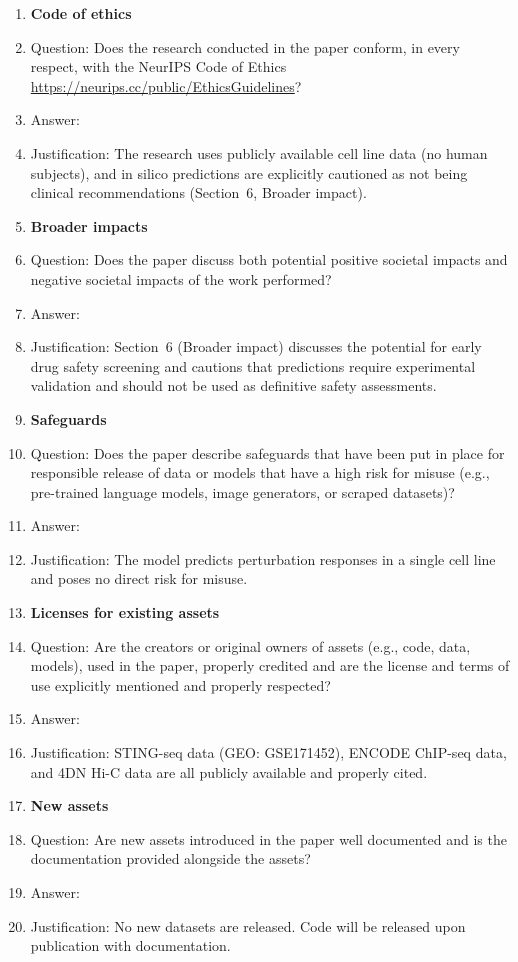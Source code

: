 \documentclass{article}
\begin{document}
\begin{enumerate}
\item {\bf Code of ethics}
    \item[] Question: Does the research conducted in the paper conform, in every respect, with the NeurIPS Code of Ethics \url{https://neurips.cc/public/EthicsGuidelines}?
    \item[] Answer: \answerYes{}
    \item[] Justification: The research uses publicly available cell line data (no human subjects), and in silico predictions are explicitly cautioned as not being clinical recommendations (Section~6, Broader impact).

\item {\bf Broader impacts}
    \item[] Question: Does the paper discuss both potential positive societal impacts and negative societal impacts of the work performed?
    \item[] Answer: \answerYes{}
    \item[] Justification: Section~6 (Broader impact) discusses the potential for early drug safety screening and cautions that predictions require experimental validation and should not be used as definitive safety assessments.

\item {\bf Safeguards}
    \item[] Question: Does the paper describe safeguards that have been put in place for responsible release of data or models that have a high risk for misuse (e.g., pre-trained language models, image generators, or scraped datasets)?
    \item[] Answer: \answerNA{}
    \item[] Justification: The model predicts perturbation responses in a single cell line and poses no direct risk for misuse.

\item {\bf Licenses for existing assets}
    \item[] Question: Are the creators or original owners of assets (e.g., code, data, models), used in the paper, properly credited and are the license and terms of use explicitly mentioned and properly respected?
    \item[] Answer: \answerYes{}
    \item[] Justification: STING-seq data (GEO: GSE171452), ENCODE ChIP-seq data, and 4DN Hi-C data are all publicly available and properly cited.

\item {\bf New assets}
    \item[] Question: Are new assets introduced in the paper well documented and is the documentation provided alongside the assets?
    \item[] Answer: \answerNA{}
    \item[] Justification: No new datasets are released. Code will be released upon publication with documentation.


\end{enumerate}
\end{document}
